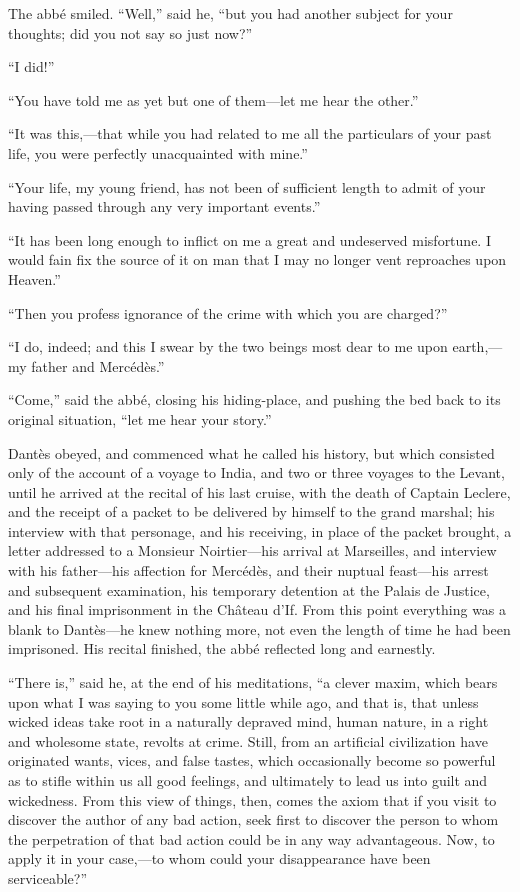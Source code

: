 The abbé smiled. “Well,” said he, “but you had another subject for your
thoughts; did you not say so just now?”

“I did!”

“You have told me as yet but one of them—let me hear the other.”

“It was this,—that while you had related to me all the particulars of
your past life, you were perfectly unacquainted with mine.”

“Your life, my young friend, has not been of sufficient length to admit
of your having passed through any very important events.”

“It has been long enough to inflict on me a great and undeserved
misfortune. I would fain fix the source of it on man that I may no
longer vent reproaches upon Heaven.”

“Then you profess ignorance of the crime with which you are charged?”

“I do, indeed; and this I swear by the two beings most dear to me upon
earth,—my father and Mercédès.”

“Come,” said the abbé, closing his hiding-place, and pushing the bed
back to its original situation, “let me hear your story.”

Dantès obeyed, and commenced what he called his history, but which
consisted only of the account of a voyage to India, and two or three
voyages to the Levant, until he arrived at the recital of his last
cruise, with the death of Captain Leclere, and the receipt of a packet
to be delivered by himself to the grand marshal; his interview with
that personage, and his receiving, in place of the packet brought, a
letter addressed to a Monsieur Noirtier—his arrival at Marseilles, and
interview with his father—his affection for Mercédès, and their nuptual
feast—his arrest and subsequent examination, his temporary detention at
the Palais de Justice, and his final imprisonment in the Château d’If.
From this point everything was a blank to Dantès—he knew nothing more,
not even the length of time he had been imprisoned. His recital
finished, the abbé reflected long and earnestly.

“There is,” said he, at the end of his meditations, “a clever maxim,
which bears upon what I was saying to you some little while ago, and
that is, that unless wicked ideas take root in a naturally depraved
mind, human nature, in a right and wholesome state, revolts at crime.
Still, from an artificial civilization have originated wants, vices,
and false tastes, which occasionally become so powerful as to stifle
within us all good feelings, and ultimately to lead us into guilt and
wickedness. From this view of things, then, comes the axiom that if you
visit to discover the author of any bad action, seek first to discover
the person to whom the perpetration of that bad action could be in any
way advantageous. Now, to apply it in your case,—to whom could your
disappearance have been serviceable?”

